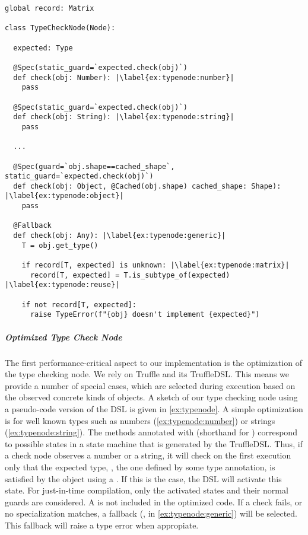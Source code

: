 \begin{lstlisting}[label={ex:typenode},escapechar=|,%
  caption={A sketch of the specializations in \code{TypeCheckNode} to minimize the run-time overhead of type checking.
    A specialization is a minimal set of operations for one specific situation, \eg,
    that the value to be checked is some type of number.},%
  float,floatplacement=htb,%
  columns=flexible,morekeywords={global,raise,pass,unknown,not}]
global record: Matrix

class TypeCheckNode(Node):

  expected: Type

  @Spec(static_guard=`expected.check(obj)`)
  def check(obj: Number): |\label{ex:typenode:number}|
    pass

  @Spec(static_guard=`expected.check(obj)`)
  def check(obj: String): |\label{ex:typenode:string}|
    pass

  ...

  @Spec(guard=`obj.shape==cached_shape`, static_guard=`expected.check(obj)`)
  def check(obj: Object, @Cached(obj.shape) cached_shape: Shape): |\label{ex:typenode:object}|
    pass
  
  @Fallback
  def check(obj: Any): |\label{ex:typenode:generic}|
    T = obj.get_type()
    
    if record[T, expected] is unknown: |\label{ex:typenode:matrix}|
      record[T, expected] = T.is_subtype_of(expected) |\label{ex:typenode:reuse}|

    if not record[T, expected]:
      raise TypeError(f"{obj} doesn't implement {expected}")
\end{lstlisting}

\subparagraph{Optimized Type Check Node}

The first performance-critical aspect to our implementation
is the optimization of the type checking node.
We rely on Truffle and its TruffleDSL\citep{humer2014domainspecific}.
This means we provide a number of special cases,
which are selected during execution based on the observed concrete 
kinds of objects.
A sketch of our type checking node using a pseudo-code version of the DSL
is given in \cref{ex:typenode}.
A simple optimization is for well known types such as
numbers (\cref{ex:typenode:number}) or strings (\cref{ex:typenode:string}).
The methods annotated with  (shorthand for )
correspond to possible states in a state machine that is generated by the
TruffleDSL.
Thus, if a check node observes a number or a string,
it will check on the first execution only that the expected type,
\ie, the one defined by some type annotation,
is satisfied by the object using a .
If this is the case, the DSL will activate this state.
For just-in-time compilation, only the activated states and their normal guards are considered.
A  is not included in the optimized code.
If a check fails, or no specialization matches,
a fallback (\ie,  in \cref{ex:typenode:generic})
will be selected. This fallback will raise a type error when appropiate.

